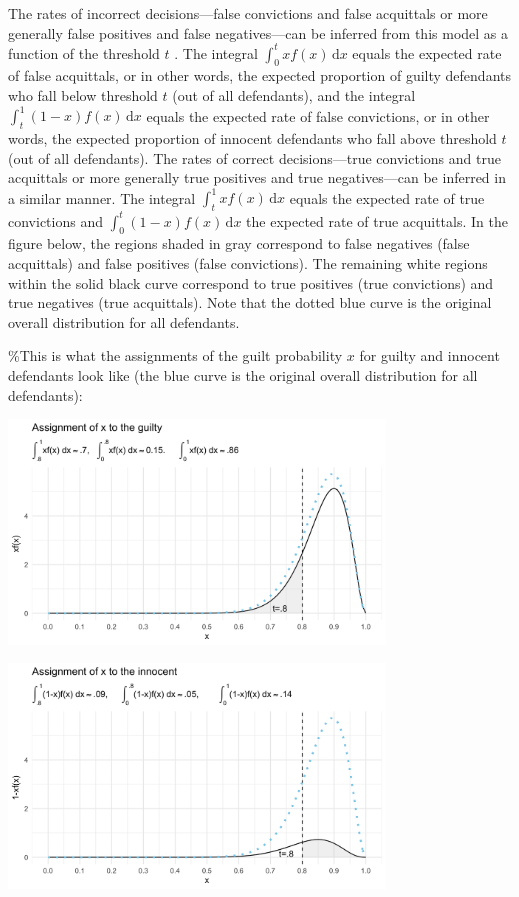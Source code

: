 \documentclass[10pt,dvipsnames,enabledeprecatedfontcommands]{scrartcl}
\begin{document}
The rates of incorrect decisions---false convictions and false
acquittals or more generally false positives and false negatives---can
be inferred from this model as a function of the threshold \(t\)
\citep{hamer2004, hamer2014}. The integral
\(\int_0^t \! xf(x) \, \mathrm{d}x\) equals the expected rate of false
acquittals, or in other words, the expected proportion of guilty
defendants who fall below threshold \(t\) (out of all defendants), and
the integral \(\int_t^1 \! (1-x)f(x) \, \mathrm{d}x\) equals the
expected rate of false convictions, or in other words, the expected
proportion of innocent defendants who fall above threshold \(t\) (out of
all defendants). The rates of correct decisions---true convictions and
true acquittals or more generally true positives and true
negatives---can be inferred in a similar manner. The integral
\(\int_t^1 \! xf(x) \, \mathrm{d}x\) equals the expected rate of true
convictions and \(\int_0^t \! (1-x)f(x) \, \mathrm{d}x\) the expected
rate of true acquittals. In the figure below, the regions shaded in gray
correspond to false negatives (false acquittals) and false positives
(false convictions). The remaining white regions within the solid black
curve correspond to true positives (true convictions) and true negatives
(true acquittals). Note that the dotted blue curve is the original
overall distribution for all defendants.

\%This is what the assignments of the guilt probability \(x\) for guilty
and innocent defendants look like (the blue curve is the original
overall distribution for all defendants):

\begin{center}
    \includegraphics[width=10cm]{xfx3.png}
\end{center}

\begin{center}
    \includegraphics[width=10cm]{nxfx3.png}
\end{center}
\end{document}
